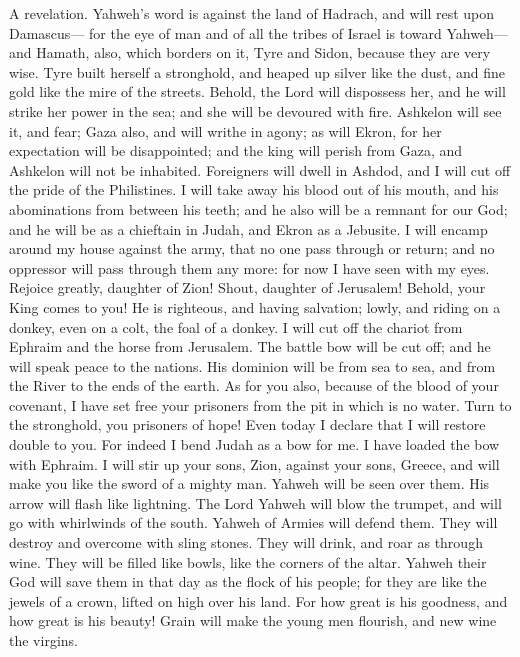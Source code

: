 A revelation. Yahweh's word is against the land of Hadrach,
and will rest upon Damascus--- for the eye of man and of all the tribes
of Israel is toward Yahweh---  and Hamath, also, which
borders on it, Tyre and Sidon, because they are very wise. 
Tyre built herself a stronghold, and heaped up silver like the dust, and
fine gold like the mire of the streets.  Behold, the Lord
will dispossess her, and he will strike her power in the sea; and she
will be devoured with fire.  Ashkelon will see it, and fear;
Gaza also, and will writhe in agony; as will Ekron, for her expectation
will be disappointed; and the king will perish from Gaza, and Ashkelon
will not be inhabited.  Foreigners will dwell in Ashdod, and
I will cut off the pride of the Philistines.  I will take
away his blood out of his mouth, and his abominations from between his
teeth; and he also will be a remnant for our God; and he will be as a
chieftain in Judah, and Ekron as a Jebusite.  I will encamp
around my house against the army, that no one pass through or return;
and no oppressor will pass through them any more: for now I have seen
with my eyes.  Rejoice greatly, daughter of Zion! Shout,
daughter of Jerusalem! Behold, your King comes to you! He is righteous,
and having salvation; lowly, and riding on a donkey, even on a colt, the
foal of a donkey.  I will cut off the chariot from Ephraim
and the horse from Jerusalem. The battle bow will be cut off; and he
will speak peace to the nations. His dominion will be from sea to sea,
and from the River to the ends of the earth.  As for you
also, because of the blood of your covenant, I have set free your
prisoners from the pit in which is no water.  Turn to the
stronghold, you prisoners of hope! Even today I declare that I will
restore double to you.  For indeed I bend Judah as a bow
for me. I have loaded the bow with Ephraim. I will stir up your sons,
Zion, against your sons, Greece, and will make you like the sword of a
mighty man.  Yahweh will be seen over them. His arrow will
flash like lightning. The Lord Yahweh will blow the trumpet, and will go
with whirlwinds of the south.  Yahweh of Armies will defend
them. They will destroy and overcome with sling stones. They will drink,
and roar as through wine. They will be filled like bowls, like the
corners of the altar.  Yahweh their God will save them in
that day as the flock of his people; for they are like the jewels of a
crown, lifted on high over his land.  For how great is his
goodness, and how great is his beauty! Grain will make the young men
flourish, and new wine the virgins.

